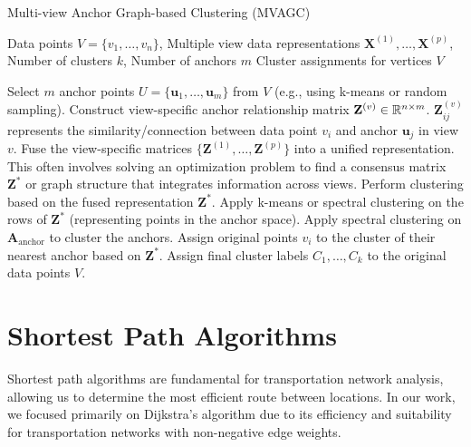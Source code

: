 \begin{algorithm}[H]
\caption{Multi-view Anchor Graph-based Clustering (MVAGC)}
\label{alg:mvagc}
\begin{algorithmic}[1]
\Require Data points $V = \{v_1, \dots, v_n\}$, Multiple view data representations $\mathbf{X}^{(1)}, \dots, \mathbf{X}^{(p)}$, Number of clusters $k$, Number of anchors $m$
\Ensure Cluster assignments for vertices $V$

\State Select $m$ anchor points $U = \{\mathbf{u}_1, \dots, \mathbf{u}_m\}$ from $V$ (e.g., using k-means or random sampling).
    \State Construct view-specific anchor relationship matrix $\mathbf{Z}^{(v)} \in \mathbb{R}^{n \times m}$. $\mathbf{Z}_{ij}^{(v)}$ represents the similarity/connection between data point $v_i$ and anchor $\mathbf{u}_j$ in view $v$.
\EndFor
\State Fuse the view-specific matrices $\{\mathbf{Z}^{(1)}, \dots, \mathbf{Z}^{(p)}\}$ into a unified representation. This often involves solving an optimization problem to find a consensus matrix $\mathbf{Z}^*$ or graph structure that integrates information across views. 
\State Perform clustering based on the fused representation $\mathbf{Z}^*$.
        \State Apply k-means or spectral clustering on the rows of $\mathbf{Z}^*$ (representing points in the anchor space).
        \State Apply spectral clustering on $\mathbf{A}_{\text{anchor}}$ to cluster the anchors.
        \State Assign original points $v_i$ to the cluster of their nearest anchor based on $\mathbf{Z}^*$.
    \EndIf
\State Assign final cluster labels $C_1, \dots, C_k$ to the original data points $V$.

\end{algorithmic}
\end{algorithm}

\section{Shortest Path Algorithms}
\label{se:ShortestPathAlgorithms}

Shortest path algorithms are fundamental for transportation network analysis, allowing us to determine the most efficient route between locations. In our work, we focused primarily on Dijkstra's algorithm due to its efficiency and suitability for transportation networks with non-negative edge weights.

